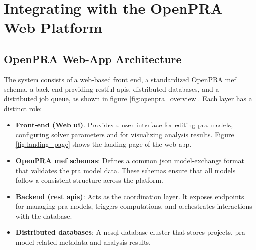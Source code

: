 \chapter{Integrating with the OpenPRA Web Platform}


\section{OpenPRA Web-App Architecture}
The system consists of a web‑based front end, a standardized OpenPRA \acrfull{mef} schema, a back end providing \acrfull{rest}ful \acrfull{api}s, distributed databases, and a distributed job queue, as shown in figure \ref{fig:openpra_overview}. Each layer has a distinct role:



\begin{itemize}
\item \textbf{Front-end (Web \acrshort{ui})}: Provides a user interface for editing \acrshort{pra} models, configuring solver parameters and for visualizing analysis results. Figure \ref{fig:landing_page} shows the landing page of the web app.
\item \textbf{OpenPRA \acrshort{mef} schemas}: Defines a common \acrshort{json} model-exchange format that validates the \acrshort{pra} model data. These schemas ensure that all models follow a consistent structure across the platform.
\item \textbf{Backend (\acrshort{rest} \acrfull{api}s)}: Acts as the coordination layer. It exposes endpoints for managing \acrshort{pra} models, triggers computations, and orchestrates interactions with the database.
\item \textbf{Distributed databases}: A \acrfull{nosql} database cluster that stores projects, \acrshort{pra} model related metadata and analysis results.
\end{itemize}

